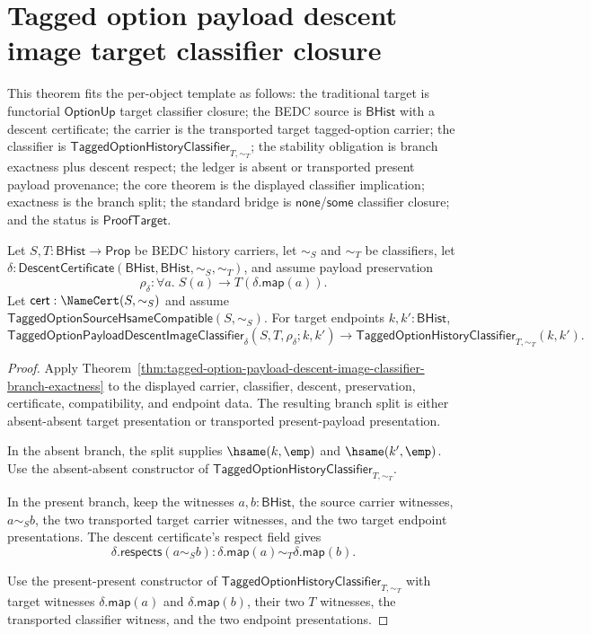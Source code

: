 \section{Tagged option payload descent image target classifier closure}
\label{sec:option-payload-descent-image-target-classifier-closure}

\begin{theorem}
\label{thm:tagged-option-payload-descent-image-classifier-target-classifier-closure}
This theorem fits the per-object template as follows: the traditional target is
functorial $\mathsf{OptionUp}$ target classifier closure; the BEDC source is
$\mathsf{BHist}$ with a descent certificate; the carrier is the transported
target tagged-option carrier; the classifier is
$\mathsf{TaggedOptionHistoryClassifier}_{T,\sim_T}$; the stability obligation is
branch exactness plus descent respect; the ledger is absent or transported
present payload provenance; the core theorem is the displayed classifier
implication; exactness is the branch split; the standard bridge is
$\mathsf{none}$/$\mathsf{some}$ classifier closure; and the status is
$\mathsf{ProofTarget}$.

Let $S,T:\mathsf{BHist}\to\mathsf{Prop}$ be BEDC history carriers, let
$\sim_S$ and $\sim_T$ be classifiers, let
$\delta:\mathsf{DescentCertificate}(\mathsf{BHist},\mathsf{BHist},\sim_S,\sim_T)$,
and assume payload preservation
$$
\rho_{\delta}:\forall a.\;S(a)\to T(\delta.\mathsf{map}(a)).
$$
Let $\mathsf{cert}:\NameCert(S,\sim_S)$ and assume
$\mathsf{TaggedOptionSourceHsameCompatible}(S,\sim_S)$. For target endpoints
$k,k':\mathsf{BHist}$,
$$
\mathsf{TaggedOptionPayloadDescentImageClassifier}_{\delta}
(S,T,\rho_{\delta};k,k')
\to
\mathsf{TaggedOptionHistoryClassifier}_{T,\sim_T}(k,k').
$$
\end{theorem}
\begin{proof}
Apply
Theorem~\ref{thm:tagged-option-payload-descent-image-classifier-branch-exactness}
to the displayed carrier, classifier, descent, preservation, certificate,
compatibility, and endpoint data. The resulting branch split is either
absent-absent target presentation or transported present-payload presentation.

In the absent branch, the split supplies $\hsame(k,\emp)$ and
$\hsame(k',\emp)$. Use the absent-absent constructor of
$\mathsf{TaggedOptionHistoryClassifier}_{T,\sim_T}$.

In the present branch, keep the witnesses $a,b:\mathsf{BHist}$, the source
carrier witnesses, $a\sim_S b$, the two transported target carrier witnesses,
and the two target endpoint presentations. The descent certificate's respect
field gives
$$
\delta.\mathsf{respects}(a\sim_S b):
\delta.\mathsf{map}(a)\sim_T\delta.\mathsf{map}(b).
$$

Use the present-present constructor of
$\mathsf{TaggedOptionHistoryClassifier}_{T,\sim_T}$ with target witnesses
$\delta.\mathsf{map}(a)$ and $\delta.\mathsf{map}(b)$, their two $T$ witnesses,
the transported classifier witness, and the two endpoint presentations.
\end{proof}

